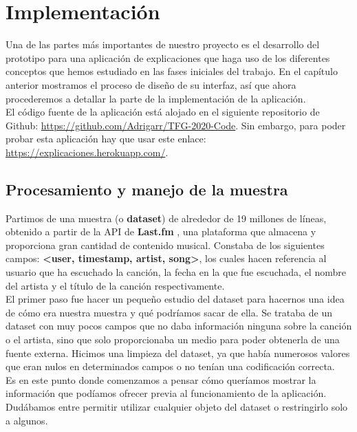 \chapter{Implementación}
\label{cap:implementacion}

Una de las partes más importantes de nuestro proyecto es el desarrollo del prototipo para una aplicación de explicaciones que haga uso de los diferentes conceptos que hemos estudiado en las fases iniciales del trabajo. En el capítulo anterior mostramos el proceso de diseño de su interfaz, así que ahora procederemos a detallar la parte de la implementación de la aplicación.\\

El código fuente de la aplicación está alojado en el siguiente repositorio de Github: \url{https://github.com/Adrigarr/TFG-2020-Code}. Sin embargo, para poder probar esta aplicación hay que usar este enlace: \url{https://explicaciones.herokuapp.com/}.\\


\section{Procesamiento y manejo de la muestra}

Partimos de una muestra (o \textbf{dataset}) de alrededor de 19 millones de líneas, obtenido a partir de la API de \textbf{Last.fm} \cite{lastfm}, una plataforma que almacena y proporciona gran cantidad de contenido musical. Constaba de los siguientes campos: \textbf{<user, timestamp, artist, song>}, los cuales hacen referencia al usuario que ha escuchado la canción, la fecha en la que fue escuchada, el nombre del artista y el título de la canción respectivamente.\\

El primer paso fue hacer un pequeño estudio del dataset para hacernos una idea de cómo era nuestra muestra y qué podríamos sacar de ella. Se trataba de un dataset con muy pocos campos que no daba información ninguna sobre la canción o el artista, sino que solo proporcionaba un medio para poder obtenerla de una fuente externa. Hicimos una limpieza del dataset, ya que había numerosos valores que eran nulos en determinados campos o no tenían una codificación correcta.\\

Es en este punto donde comenzamos a pensar cómo queríamos mostrar la información que podíamos ofrecer previa al funcionamiento de la aplicación. Dudábamos entre permitir utilizar cualquier objeto del dataset o restringirlo solo a algunos.\\

